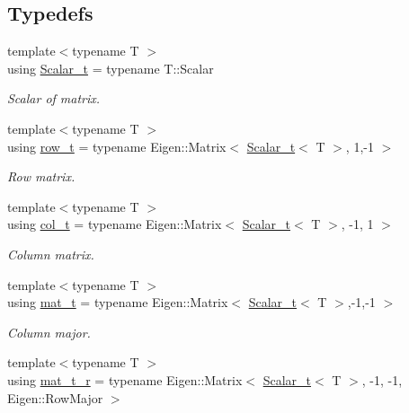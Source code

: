 \subsection*{Typedefs}
\begin{DoxyCompactItemize}
\item 
{\footnotesize template$<$typename T $>$ }\\using \hyperlink{namespaceMackey_a93ba297573961f91101fb84bc84bbe95}{Scalar\+\_\+t} = typename T\+::\+Scalar
\begin{DoxyCompactList}\small\item\em Scalar of matrix. \end{DoxyCompactList}\item 
{\footnotesize template$<$typename T $>$ }\\using \hyperlink{namespaceMackey_a6d37801553e585770ca7d1243ab3b213}{row\+\_\+t} = typename Eigen\+::\+Matrix$<$ \hyperlink{namespaceMackey_a93ba297573961f91101fb84bc84bbe95}{Scalar\+\_\+t}$<$ T $>$, 1,-\/1 $>$
\begin{DoxyCompactList}\small\item\em Row matrix. \end{DoxyCompactList}\item 
{\footnotesize template$<$typename T $>$ }\\using \hyperlink{namespaceMackey_a3374980e3b5001f5ba9b206004180627}{col\+\_\+t} = typename Eigen\+::\+Matrix$<$ \hyperlink{namespaceMackey_a93ba297573961f91101fb84bc84bbe95}{Scalar\+\_\+t}$<$ T $>$, -\/1, 1 $>$
\begin{DoxyCompactList}\small\item\em Column matrix. \end{DoxyCompactList}\item 
{\footnotesize template$<$typename T $>$ }\\using \hyperlink{namespaceMackey_a035386035757dade630f685e508e5cf9}{mat\+\_\+t} = typename Eigen\+::\+Matrix$<$ \hyperlink{namespaceMackey_a93ba297573961f91101fb84bc84bbe95}{Scalar\+\_\+t}$<$ T $>$,-\/1,-\/1 $>$
\begin{DoxyCompactList}\small\item\em Column major. \end{DoxyCompactList}\item 
{\footnotesize template$<$typename T $>$ }\\using \hyperlink{namespaceMackey_ac1c9f85957dda772ceaa564cb23494cb}{mat\+\_\+t\+\_\+r} = typename Eigen\+::\+Matrix$<$ \hyperlink{namespaceMackey_a93ba297573961f91101fb84bc84bbe95}{Scalar\+\_\+t}$<$ T $>$, -\/1, -\/1, Eigen\+::\+Row\+Major $>$

\end{DoxyCompactItemize}
